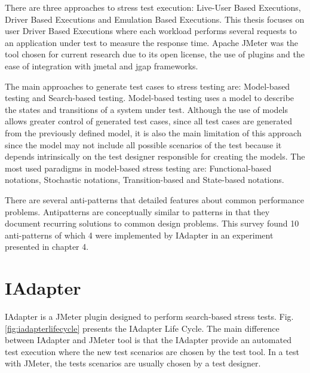 \documentclass[espaco=umemeio,chapter=TITLE,twoside,openright]{abnt}
\begin{document}
There are three approaches to stress test execution: Live-User Based Executions, Driver Based Executions and Emulation Based Executions. This thesis focuses on user Driver Based Executions where each workload performs several requests to an application under test to measure the response time. Apache JMeter was the tool chosen for current research due to its open license, the use of plugins and the ease of integration with jmetal and jgap frameworks.

The main approaches to generate test cases to stress testing are: Model-based testing and Search-based testing. Model-based testing uses a model to describe the states and transitions of a system under test. Although the use of models allows greater control of generated test cases, since all test cases are generated from the previously defined model, it is also the main limitation of this approach since the model may not include all possible scenarios of the test because it depends intrinsically on the test designer responsible for creating the models. The most used paradigms in model-based stress testing are:  Functional-based notations, Stochastic notations, Transition-based and State-based notations. 

There are several anti-patterns that detailed features about common performance problems. Antipatterns
are conceptually similar to patterns in that they document recurring solutions to common design problems. This survey found 10 anti-patterns of which 4 were  implemented by IAdapter in an experiment presented in chapter 4.



\chapter{IAdapter }



IAdapter is a JMeter plugin designed to perform search-based stress tests. Fig. \ref{fig:iadapterlifecycle} presents the IAdapter Life Cycle. The main difference between IAdapter and JMeter tool is that the IAdapter provide an automated test execution where the new test scenarios are chosen by the test tool.  In a test with JMeter, the tests scenarios are usually chosen by a test designer.
\end{document}
